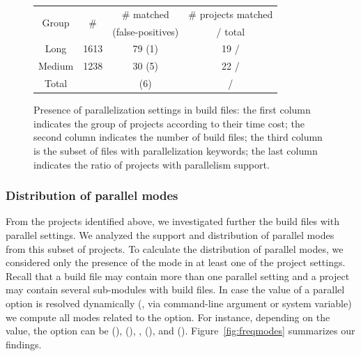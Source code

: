 \begin{figure}[ht!]
    \centering
    \begin{tabular*}{0.48\textwidth}{@{\extracolsep{\fill}}cccc}
        \toprule
        \multirow{2}{*}{Group} %
            & \multirow{2}{*}{\# \pomf{}}
            & \# \pomf{} matched
            & \# projects matched\\%
            & %
            & (false-positives)
            & / total\\%
        \midrule%
        Long   & 1613 & 79 (1) & 19 / \numLong{}\\%
        Medium & 1238 & 30 (5) & 22 / \numMed{}\\%
        \midrule%
        Total %
            & \pomMedLong{}
            & \numPomMatched{} (6)
            & \numProjectsPar{} / \numMedLong{}\\%
        \bottomrule%
    \end{tabular*}
    \caption{Presence of parallelization settings in build files: the
    first column indicates the group of projects according to their
    time cost; the second column indicates the number of build files;
    the third column is the subset of files with parallelization
    keywords; the last column indicates the ratio of projects with
    parallelism support.}
    \label{tab:inspection-table} 
\end{figure}

\subsubsection{Distribution of parallel modes}

From the \numProjectsPar{} projects identified above, we investigated
further the \numPomMatchedValid{} build files with parallel settings.
We analyzed the support and distribution of parallel modes from this
subset of projects. To calculate the distribution of parallel modes,
we considered only the presence of the mode in at least one of the
project settings.  Recall that a build file may contain more than one
parallel setting and a project may contain several sub-modules with
build files.  In case the value of a parallel option is resolved
dynamically (\eg, via command-line argument or system variable) we
compute all modes related to the option. For instance, depending on
the value, the  option can be \Seq{} (),
\ParClassSeqMeth{} (), \SeqClassParMeth{},
(), and \ParClassParMeth{} ().
Figure~\ref{fig:freqmodes} summarizes our findings.  

